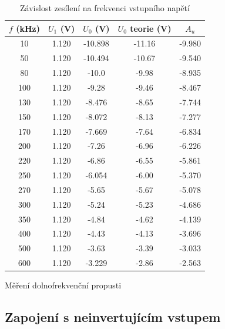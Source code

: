 \documentclass[a4paper,11pt]{article}
\begin{document}
\begin{table}[h]
    \begin{minipage}{.5\linewidth}
        \centering
        \begin{tabular}{| c c c c c |}
            \hline
            $ f $ (kHz) & $ U_1 $ (V)  & $ U_0 $  (V) & $ U_0 $ teorie (V) & $ A_u $  \\
            \hline    
            10  & 1.120 &  -10.898  &  -11.16 & -9.980 \\
            50  & 1.120 &  -10.494  &  -10.67 & -9.540 \\
            80  & 1.120 &  -10.0    &  -9.98  & -8.935 \\
            100 & 1.120 &  -9.28    &  -9.46  & -8.467 \\
            130 & 1.120 &  -8.476   &  -8.65  & -7.744 \\
            150 & 1.120 &  -8.072   &  -8.13  & -7.277 \\
            170 & 1.120 &  -7.669   &  -7.64  & -6.834 \\
            200 & 1.120 &  -7.26    &  -6.96  & -6.226 \\
            220 & 1.120 &  -6.86    &  -6.55  & -5.861 \\
            250 & 1.120 &  -6.054   &  -6.00  & -5.370 \\
            270 & 1.120 &  -5.65    &  -5.67  & -5.078 \\
            300 & 1.120 &  -5.24    &  -5.23  & -4.686 \\
            350 & 1.120 &  -4.84    &  -4.62  & -4.139 \\
            400 & 1.120 &  -4.43    &  -4.13  & -3.696 \\
            500 & 1.120 &  -3.63    &  -3.39  & -3.033 \\
            600 & 1.120 &  -3.229   &  -2.86  & -2.563 \\
            \hline
        \end{tabular}
        \caption{Měření dolnofrekvenční propusti}
    \end{minipage} 
    \hfill
    \begin{minipage}{.45\linewidth}
        \centering
        \resizebox{\textwidth}{!}{  }
        \captionsetup{type=graph}
        \caption{Závislost zesílení na frekvenci vstupního napětí}
    \end{minipage} 
\end{table}

\subsection{Zapojení s neinvertujícím vstupem}
\end{document}
